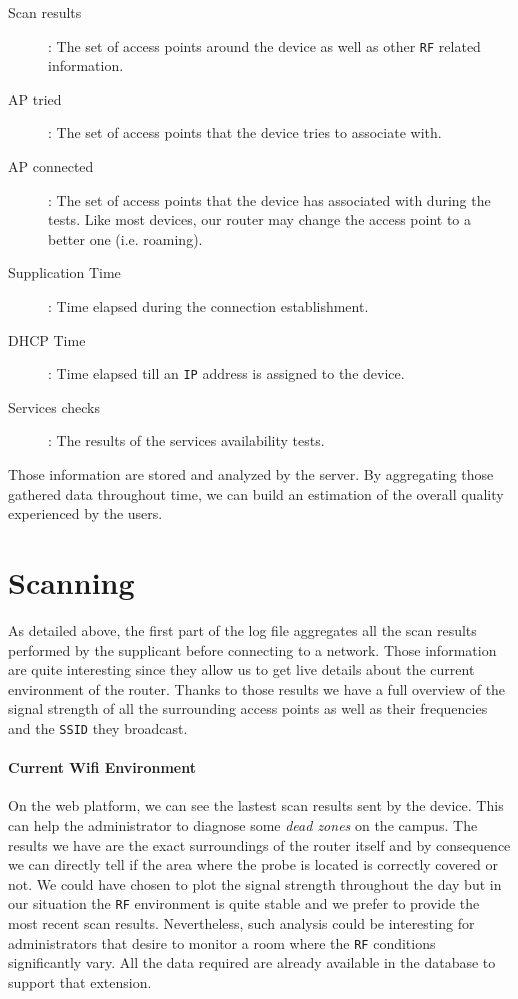 \begin{description}
	\item[Scan results]: The set of access points around the device as well as other \texttt{RF} related information.
	\item[AP tried]: The set of access points that the device tries to associate with.
	\item[AP connected]: The set of access points that the device has associated with during the tests. Like most devices, our router may change the access point to a better one (i.e. roaming).
	\item[Supplication Time]: Time elapsed during the connection establishment.
	\item [DHCP Time]: Time elapsed till an \texttt{IP} address is assigned to the device.
	\item [Services checks]: The results of the services availability tests.
\end{description}

Those information are stored and analyzed by the server. By aggregating those gathered data throughout time, we can build an estimation of the overall quality experienced by the users.

\section{Scanning}
As detailed above, the first part of the log file aggregates all the scan results performed by the supplicant before connecting to a network. Those information are quite interesting since they allow us to get live details about the current environment of the router. Thanks to those results we have a full overview of the signal strength of all the surrounding access points as well as their frequencies and the \texttt{SSID} they broadcast. 


\paragraph*{Current Wifi Environment} On the web platform, we can see the lastest scan results sent by the device. This can help the administrator to diagnose some \emph{dead zones} on the campus. The results we have are the exact surroundings of the router itself and by consequence we can directly tell if the area where the probe is located is correctly covered or not. We could have chosen to plot the signal strength throughout the day but in our situation the \texttt{RF} environment is quite stable and we prefer to provide the most recent scan results. Nevertheless, such analysis could be interesting for administrators that desire to monitor a room where the \texttt{RF} conditions significantly vary. All the data required are already available in the database to support that extension.

